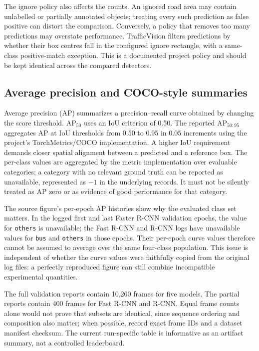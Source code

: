 The ignore policy also affects the counts. An ignored road area may contain unlabelled or partially annotated objects; treating every such prediction as false positive can distort the comparison. Conversely, a policy that removes too many predictions may overstate performance. TrafficVision filters predictions by whether their box centres fall in the configured ignore rectangle, with a same-class positive-match exception. This is a documented project policy and should be kept identical across the compared detectors.

\subsection{Average precision and COCO-style summaries}
Average precision (AP) summarizes a precision--recall curve obtained by changing the score threshold. AP$_{50}$ uses an IoU criterion of 0.50. The reported AP$_{50:95}$ aggregates AP at IoU thresholds from 0.50 to 0.95 in 0.05 increments using the project's TorchMetrics/COCO implementation. A higher IoU requirement demands closer spatial alignment between a predicted and a reference box. The per-class values are aggregated by the metric implementation over evaluable categories; a category with no relevant ground truth can be reported as unavailable, represented as $-1$ in the underlying records. It must not be silently treated as AP zero or as evidence of good performance for that category.

The source figure's per-epoch AP histories show why the evaluated class set matters. In the logged first and last Faster R-CNN validation epochs, the value for \texttt{others} is unavailable; the Fast R-CNN and R-CNN logs have unavailable values for \texttt{bus} and \texttt{others} in those epochs. Their per-epoch curve values therefore cannot be assumed to average over the same four-class population. This issue is independent of whether the curve values were faithfully copied from the original log files: a perfectly reproduced figure can still combine incompatible experimental quantities.

The full validation reports contain 10,260 frames for five models. The partial reports contain 400 frames for Fast R-CNN and R-CNN. Equal frame counts alone would not prove that subsets are identical, since sequence ordering and composition also matter; when possible, record exact frame IDs and a dataset manifest checksum. The current run-specific table is informative as an artifact summary, not a controlled leaderboard.

